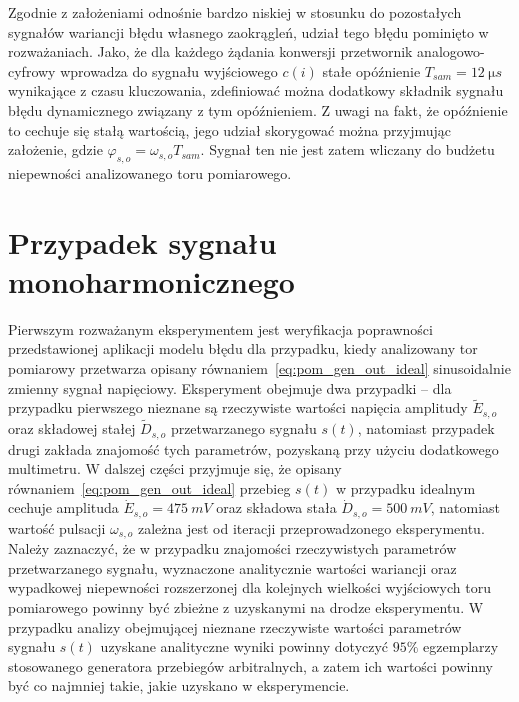 Zgodnie z założeniami odnośnie bardzo niskiej w stosunku do pozostałych sygnałów wariancji błędu własnego zaokrągleń, udział tego błędu pominięto w rozważaniach. Jako, że dla każdego żądania konwersji przetwornik analogowo-cyfrowy wprowadza do sygnału wyjściowego $c(i)$ stałe opóźnienie $T_{sam} = \qty{12}{\micro s}$ wynikające z czasu kluczowania, zdefiniować można dodatkowy składnik sygnału błędu dynamicznego związany z tym opóźnieniem. Z uwagi na fakt, że opóźnienie to cechuje się stałą wartością, jego udział skorygować można przyjmując założenie, gdzie $\varphi_{s,o} = \omega_{s,o} T_{sam}$. Sygnał ten nie jest zatem wliczany do budżetu niepewności analizowanego toru pomiarowego.

\section{Przypadek sygnału monoharmonicznego}

Pierwszym rozważanym eksperymentem jest weryfikacja poprawności przedstawionej aplikacji modelu błędu dla przypadku, kiedy analizowany tor pomiarowy przetwarza opisany równaniem~\eqref{eq:pom_gen_out_ideal} sinusoidalnie zmienny sygnał napięciowy. Eksperyment obejmuje dwa przypadki -- dla przypadku pierwszego nieznane są rzeczywiste wartości napięcia amplitudy $\tilde{E}_{s,o}$ oraz składowej stałej $\tilde{D}_{s,o}$ przetwarzanego sygnału $s(t)$, natomiast przypadek drugi zakłada znajomość tych parametrów, pozyskaną przy użyciu dodatkowego multimetru. W dalszej części przyjmuje się, że opisany równaniem~\eqref{eq:pom_gen_out_ideal} przebieg $s(t)$ w przypadku idealnym cechuje amplituda $\dot{E}_{s,o} = \qty{475}{mV}$ oraz składowa stała $\dot{D}_{s,o} = \qty{500}{mV}$, natomiast wartość pulsacji $\omega_{s,o}$ zależna jest od iteracji przeprowadzonego eksperymentu. Należy zaznaczyć, że w przypadku znajomości rzeczywistych parametrów przetwarzanego sygnału, wyznaczone analitycznie wartości wariancji oraz wypadkowej niepewności rozszerzonej dla kolejnych wielkości wyjściowych toru pomiarowego powinny być zbieżne z uzyskanymi na drodze eksperymentu. W przypadku analizy obejmującej nieznane rzeczywiste wartości parametrów sygnału $s(t)$ uzyskane analityczne wyniki powinny dotyczyć $95\%$ egzemplarzy stosowanego generatora przebiegów arbitralnych, a zatem ich wartości powinny być co najmniej takie, jakie uzyskano w eksperymencie.

